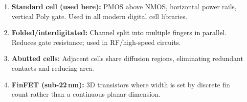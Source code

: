 \documentclass[12pt, a4paper]{article}
\begin{document}
\begin{enumerate}
    \item \textbf{Standard cell (used here):} PMOS above NMOS, horizontal power rails, vertical Poly gate. Used in all modern digital cell libraries.
    \item \textbf{Folded/interdigitated:} Channel split into multiple fingers in parallel. Reduces gate resistance; used in RF/high-speed circuits.
    \item \textbf{Abutted cells:} Adjacent cells share diffusion regions, eliminating redundant contacts and reducing area.
    \item \textbf{FinFET (sub-22\,nm):} 3D transistors where width is set by discrete fin count rather than a continuous planar dimension.
\end{enumerate}
\end{document}
